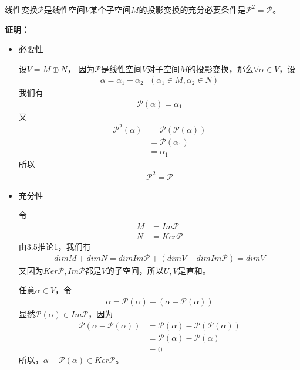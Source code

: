 \documentclass{article}
\begin{document}
\begin{zremark}
  线性变换$\mathscr{P}$是线性空间$V$某个子空间$M$的投影变换的充分必要条件是$\mathscr{P}^2 = \mathscr{P}$。
\end{zremark}

\textbf{证明：}

\begin{itemize}
  \item 必要性

        设$V = M \oplus N$，
        因为$\mathscr{P}$是线性空间$V$对子空间$M$的投影变换，那么$\forall \alpha \in V$，设
        \begin{align*}
          \alpha = \alpha_1 + \alpha_2 \ \ \ (\alpha_1 \in M, \alpha_2 \in N)
        \end{align*}
        我们有
        \begin{align*}
          \mathscr{P}(\alpha) = \alpha_1
        \end{align*}
        又
        \begin{align*}
          \mathscr{P}^2(\alpha) & = \mathscr{P}(\mathscr{P}(\alpha)) \\
                                & = \mathscr{P}(\alpha_1)            \\
                                & = \alpha_1
        \end{align*}
        所以
        \begin{align*}
          \mathscr{P}^2 = \mathscr{P}
        \end{align*}

  \item 充分性

        令
        \begin{align*}
          M & = Im\mathscr{P}  \\
          N & = Ker\mathscr{P}
        \end{align*}
        由3.5推论1，我们有
        \begin{align*}
          dim M + dim N = dim Im\mathscr{P} + (dim V - dim Im\mathscr{P}) = dim V
        \end{align*}
        又因为$Ker\mathscr{P}, Im\mathscr{P}$都是$V$的子空间，所以$U, V$是直和。

        任意$\alpha \in V$，令
        \begin{align*}
          \alpha = \mathscr{P}(\alpha) + (\alpha - \mathscr{P}(\alpha))
        \end{align*}
        显然$\mathscr{P}(\alpha) \in Im \mathscr{P}$，因为
        \begin{align*}
          \mathscr{P}(\alpha - \mathscr{P}(\alpha))
           & = \mathscr{P}(\alpha) - \mathscr{P}(\mathscr{P}(\alpha)) \\
           & = \mathscr{P}(\alpha) - \mathscr{P}(\alpha)              \\
           & = 0
        \end{align*}
        所以，$\alpha - \mathscr{P}(\alpha) \in Ker\mathscr{P}$。


\end{itemize}
\end{document}
